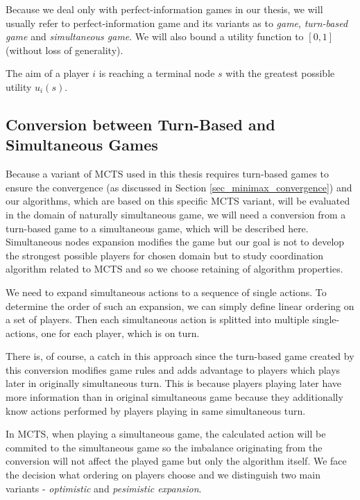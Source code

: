 Because we deal only with perfect-information games in our thesis, we will usually refer to
perfect-information game and its variants as to \emph{game}, \emph{turn-based game} and
\emph{simultaneous game}. We will also bound a utility function to $[0,1]$ (without loss of
generality).

The aim of a player $i$ is reaching a terminal node $s$ with the greatest possible utility
$u_i(s)$.

\subsection{Conversion between Turn-Based and Simultaneous Games}
\label{sec_turn_based_game_conversion}

Because a variant of MCTS used in this thesis requires turn-based games to ensure the
convergence (as discussed in
Section \ref{sec_minimax_convergence}) and our
algorithms, which are based on this specific MCTS variant, will be evaluated in the domain
of naturally simultaneous game,
we will need a conversion from a turn-based game to a simultaneous game, which will be described
here. Simultaneous nodes expansion modifies the game but our goal is not to develop the strongest 
possible players  for chosen domain but to study coordination algorithm related to MCTS and so
we choose retaining of algorithm properties.

We need to expand simultaneous actions to a sequence of single actions. To determine the order of such
an expansion, we can simply define linear ordering on a set of players. Then each simultaneous
action 
is splitted into multiple single-actions, one for each player, which is on turn.

There is, of course, a catch in this approach since the turn-based game created by this conversion
modifies game rules and adds advantage to players which plays later in originally simultaneous turn.
This is because players playing later have more information than in original simultaneous game
because they additionally know actions performed by players playing in same simultaneous turn.

In MCTS, when playing a simultaneous game, the calculated action will be commited to the simultaneous
game so the imbalance originating from the conversion will not affect the played game but only the
algorithm itself. We face the decision what ordering on players choose and we distinguish two main
variants - \emph{optimistic} and \emph{pesimistic expansion}. 

